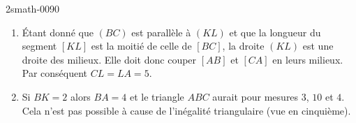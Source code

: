 
\begin{corrige}{2smath-0090}

    \begin{enumerate}
        \item
    Étant donné que \( (BC)\) est parallèle à \( (KL)\) et que la longueur du segment \( [KL]\) est la moitié de celle de \( [BC]\), la droite \( (KL)\) est une droite des milieux. Elle doit donc couper \( [AB]\) et \( [CA]\) en leurs milieux. Par conséquent \( CL=LA=5\).
\item
    Si \( BK=2\) alors \( BA=4\) et le triangle \( ABC\) aurait pour mesures \( 3\), \( 10\) et \( 4\). Cela n'est pas possible à cause de l'inégalité triangulaire (vue en cinquième).
    \end{enumerate}

\end{corrige}
